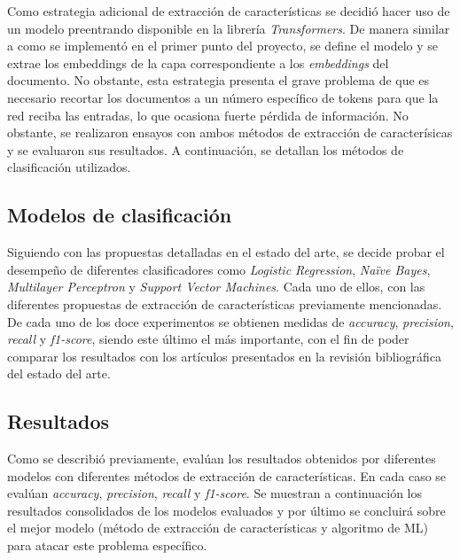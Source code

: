 Como estrategia adicional de extracción de características se decidió hacer uso de un modelo preentrando disponible en la librería \textit{Transformers}. De manera similar a como se implementó en el primer punto del proyecto, se define el modelo y se extrae los embeddings de la capa correspondiente a los \textit{embeddings} del documento. No obstante, esta estrategia presenta el grave problema de que es necesario recortar los documentos a un número específico de tokens para que la red reciba las entradas, lo que ocasiona fuerte pérdida de información. No obstante, se realizaron ensayos con ambos métodos de extracción de caracterísicas y se evaluaron sus resultados. A continuación, se detallan los métodos de clasificación utilizados.

\subsection{Modelos de clasificación}
Siguiendo con las propuestas detalladas en el estado del arte, se decide probar el desempeño de diferentes clasificadores como \textit{Logistic Regression}, \textit{Naïve Bayes}, \textit{Multilayer Perceptron} y \textit{Support Vector Machines}. Cada uno de ellos, con las diferentes propuestas de extracción de características previamente mencionadas. De cada uno de los doce experimentos se obtienen medidas de \textit{accuracy}, \textit{precision}, \textit{recall} y \textit{f1-score}, siendo este último el más importante, con el fin de poder comparar los resultados con los artículos presentados en la revisión bibliográfica del estado del arte.

\subsection{Resultados}
Como se describió previamente, evalúan los resultados obtenidos por diferentes modelos con diferentes métodos de extracción de características. En cada caso se evalúan \textit{accuracy}, \textit{precision}, \textit{recall} y \textit{f1-score}. Se muestran a continuación los resultados consolidados de los modelos evaluados y por último se concluirá sobre el mejor modelo (método de extracción de características y algoritmo de ML) para atacar este problema específico.


